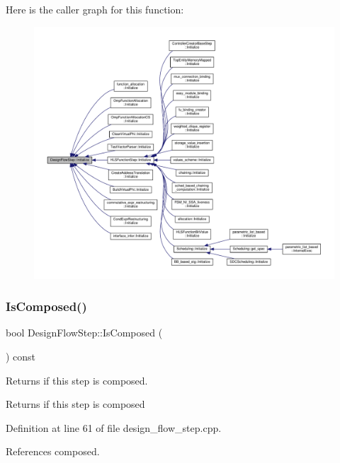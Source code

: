 Here is the caller graph for this function\+:
\nopagebreak
\begin{figure}[H]
\begin{center}
\leavevmode
\includegraphics[width=350pt]{d3/da9/classDesignFlowStep_a44b50683382a094976e1d432a7784799_icgraph}
\end{center}
\end{figure}
\mbox{\label{classDesignFlowStep_a4aa24c5bf7334ad80130ace3f6d5d7d6}} 
\subsubsection{\texorpdfstring{Is\+Composed()}{IsComposed()}}
{\footnotesize\ttfamily bool Design\+Flow\+Step\+::\+Is\+Composed (\begin{DoxyParamCaption}{ }\end{DoxyParamCaption}) const}



Returns if this step is composed. 

\begin{DoxyReturn}{Returns}
if this step is composed 
\end{DoxyReturn}


Definition at line 61 of file design\+\_\+flow\+\_\+step.\+cpp.



References composed.

